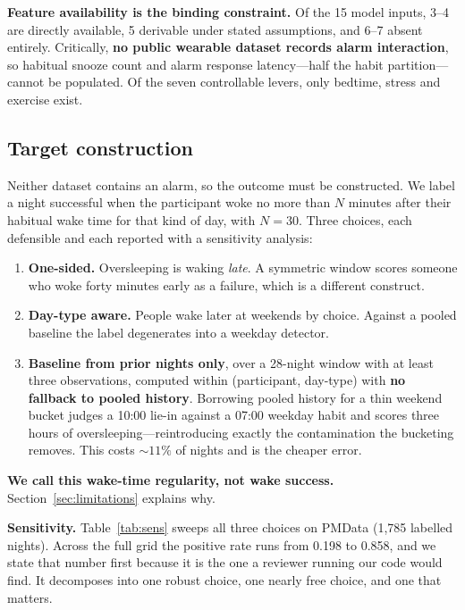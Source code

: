 \documentclass[conference]{IEEEtran}
\begin{document}
\textbf{Feature availability is the binding constraint.} Of the 15 model inputs,
3--4 are directly available, 5 derivable under stated assumptions, and 6--7
absent entirely. Critically, \textbf{no public wearable dataset records alarm
interaction}, so habitual snooze count and alarm response latency---half the
habit partition---cannot be populated. Of the seven controllable levers, only
bedtime, stress and exercise exist.

\subsection{Target construction}

Neither dataset contains an alarm, so the outcome must be constructed. We label
a night successful when the participant woke no more than $N$ minutes after
their habitual wake time for that kind of day, with $N = 30$. Three choices,
each defensible and each reported with a sensitivity analysis:

\begin{enumerate}
\item \textbf{One-sided.} Oversleeping is waking \emph{late}. A symmetric window
      scores someone who woke forty minutes early as a failure, which is a
      different construct.
\item \textbf{Day-type aware.} People wake later at weekends by choice. Against
      a pooled baseline the label degenerates into a weekday detector.
\item \textbf{Baseline from prior nights only}, over a 28-night window with at
      least three observations, computed within (participant, day-type) with
      \textbf{no fallback to pooled history}. Borrowing pooled history for a
      thin weekend bucket judges a 10:00 lie-in against a 07:00 weekday habit
      and scores three hours of oversleeping---reintroducing exactly the
      contamination the bucketing removes. This costs ${\sim}11\%$ of nights and
      is the cheaper error.
\end{enumerate}

\textbf{We call this wake-time regularity, not wake success.}
Section~\ref{sec:limitations} explains why.

\textbf{Sensitivity.} Table~\ref{tab:sens} sweeps all three choices on PMData
(1{,}785 labelled nights). Across the full grid the positive rate runs from
0.198 to 0.858, and we state that number first because it is the one a reviewer
running our code would find. It decomposes into one robust choice, one nearly
free choice, and one that matters.
\end{document}
